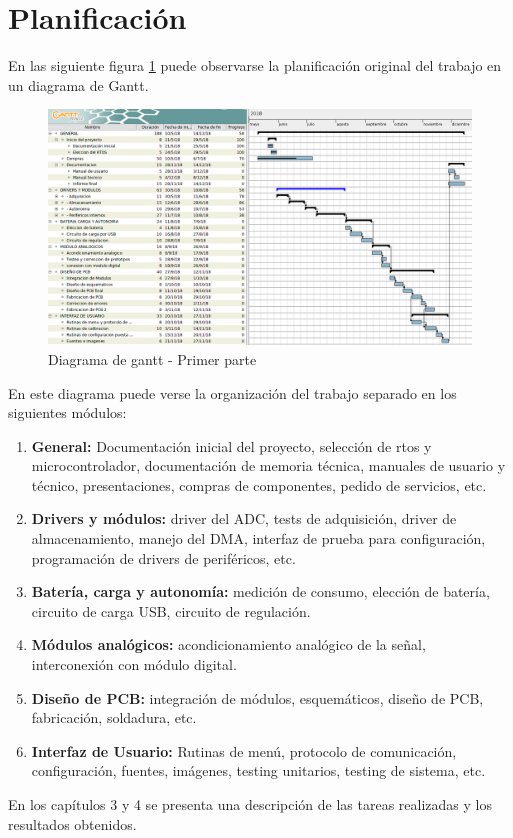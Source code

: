 \section{Planificación}

En las siguiente figura \ref{fig:gantt}  puede observarse la planificación original del trabajo en un diagrama de Gantt. 

\begin{figure}
	\centering	
	\includegraphics[width=\textwidth]{./Figures/gantt.png}
	\caption{Diagrama de gantt - Primer parte}
	\label{fig:gantt}
\end{figure}

En este diagrama puede verse la organización del trabajo separado en los siguientes módulos:

\begin{enumerate}

\item \textbf{General:} Documentación inicial del proyecto, selección de rtos y microcontrolador, documentación de memoria técnica, manuales de usuario y técnico, presentaciones, compras de componentes, pedido de servicios, etc.

\item \textbf{Drivers y módulos:} driver del ADC, tests de adquisición, driver de almacenamiento, manejo del DMA, interfaz de prueba para configuración, programación de drivers de periféricos, etc.

\item \textbf{Batería, carga y autonomía:} medición de consumo, elección de batería, circuito de carga USB, circuito de regulación.

\item \textbf{Módulos analógicos:} acondicionamiento analógico de la señal, interconexión con módulo digital.

\item \textbf{Diseño de PCB:} integración de módulos, esquemáticos, diseño de PCB, fabricación, soldadura, etc.

\item \textbf{Interfaz de Usuario:} Rutinas de menú, protocolo de comunicación, configuración, fuentes, imágenes, testing unitarios, testing de sistema, etc.

\end{enumerate}

En los capítulos 3 y 4 se presenta una descripción de las tareas realizadas y los resultados obtenidos.